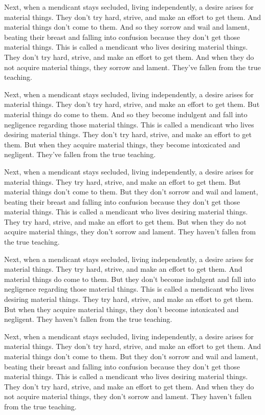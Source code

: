 \documentclass[12pt,openany]{book}%
\begin{document}
Next, when a mendicant stays secluded, living independently, a desire arises for material things. They don’t try hard, strive, and make an effort to get them. And material things don’t come to them. And so they sorrow and wail and lament, beating their breast and falling into confusion because they don’t get those material things. This is called a mendicant who lives desiring material things. They don’t try hard, strive, and make an effort to get them. And when they do not acquire material things, they sorrow and lament. They’ve fallen from the true teaching. 

Next, when a mendicant stays secluded, living independently, a desire arises for material things. They don’t try hard, strive, and make an effort to get them. But material things do come to them. And so they become indulgent and fall into negligence regarding those material things. This is called a mendicant who lives desiring material things. They don’t try hard, strive, and make an effort to get them. But when they acquire material things, they become intoxicated and negligent. They’ve fallen from the true teaching. 

Next, when a mendicant stays secluded, living independently, a desire arises for material things. They try hard, strive, and make an effort to get them. But material things don’t come to them. But they don’t sorrow and wail and lament, beating their breast and falling into confusion because they don’t get those material things. This is called a mendicant who lives desiring material things. They try hard, strive, and make an effort to get them. But when they do not acquire material things, they don’t sorrow and lament. They haven’t fallen from the true teaching. 

Next, when a mendicant stays secluded, living independently, a desire arises for material things. They try hard, strive, and make an effort to get them. And material things do come to them. But they don’t become indulgent and fall into negligence regarding those material things. This is called a mendicant who lives desiring material things. They try hard, strive, and make an effort to get them. But when they acquire material things, they don’t become intoxicated and negligent. They haven’t fallen from the true teaching. 

Next, when a mendicant stays secluded, living independently, a desire arises for material things. They don’t try hard, strive, and make an effort to get them. And material things don’t come to them. But they don’t sorrow and wail and lament, beating their breast and falling into confusion because they don’t get those material things. This is called a mendicant who lives desiring material things. They don’t try hard, strive, and make an effort to get them. And when they do not acquire material things, they don’t sorrow and lament. They haven’t fallen from the true teaching. 
\end{document}
